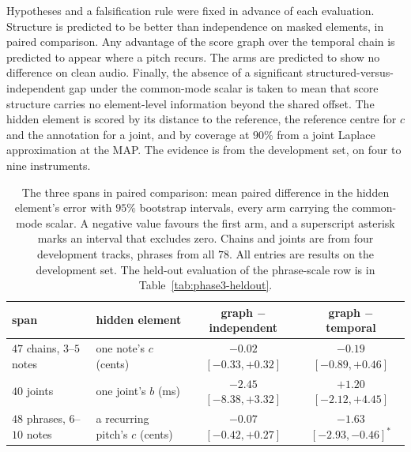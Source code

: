 Hypotheses and a falsification rule were fixed in advance of each
evaluation. Structure is predicted to be better than independence on
masked elements, in paired comparison. Any advantage of the score graph
over the temporal chain is predicted to appear where a pitch recurs. The
arms are predicted to show no difference on clean audio. Finally, the
absence of a significant structured-versus-independent gap under the
common-mode scalar is taken to mean that score structure carries no
element-level information beyond the shared offset. The hidden element is
scored by its distance to the reference, the reference centre for $c$ and
the annotation for a joint, and by coverage at $90\%$ from a joint Laplace
approximation at the MAP. The evidence is from the development set, on four
to nine instruments.


\begin{table}[t]\centering
\caption{The three spans in paired comparison: mean paired difference in
the hidden element's error with $95\%$ bootstrap intervals, every arm
carrying the common-mode scalar. A negative value favours the first arm,
and a superscript asterisk marks an interval that excludes zero. Chains and
joints are from four development tracks, phrases from all $78$. All
entries are results on the development set. The held-out evaluation of
the phrase-scale row is in Table~\ref{tab:phase3-heldout}.}
\label{tab:phase3-priorvalue}
\footnotesize
\begin{tabular}{@{}llcc@{}}
\toprule
span & hidden element & graph $-$ independent & graph $-$ temporal \\
\midrule
$47$ chains, $3$--$5$ notes & one note's $c$ (cents) & $-0.02$ $[-0.33,+0.32]$ & $-0.19$ $[-0.89,+0.46]$ \\
$40$ joints & one joint's $b$ (ms) & $-2.45$ $[-8.38,+3.32]$ & $+1.20$ $[-2.12,+4.45]$ \\
$48$ phrases, $6$--$10$ notes & a recurring pitch's $c$ (cents) & $-0.07$ $[-0.42,+0.27]$ & $-1.63$ $[-2.93,-0.46]^{*}$ \\
\bottomrule
\end{tabular}
\end{table}

